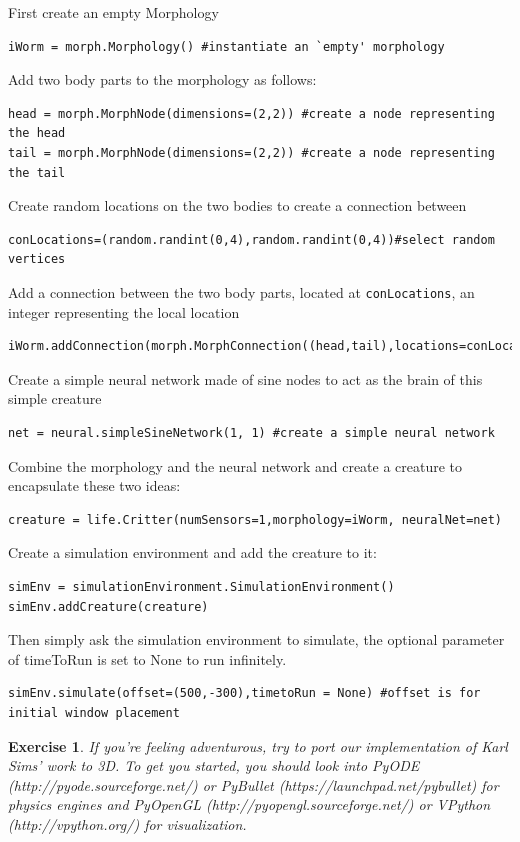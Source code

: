 \documentclass[12pt]{article}
\newtheorem{ex}{Exercise}
\begin{document}
First create an empty Morphology
\begin{verbatim}
iWorm = morph.Morphology() #instantiate an `empty' morphology
\end{verbatim}

Add two body parts to the morphology  as follows:
\begin{verbatim}
head = morph.MorphNode(dimensions=(2,2)) #create a node representing the head
tail = morph.MorphNode(dimensions=(2,2)) #create a node representing the tail
\end{verbatim}

Create random locations on the two bodies to create a connection between
\begin{verbatim}
conLocations=(random.randint(0,4),random.randint(0,4))#select random vertices
\end{verbatim}
Add a connection between the two body parts, located at \verb|conLocations|, an integer representing the local location
\begin{verbatim} 
iWorm.addConnection(morph.MorphConnection((head,tail),locations=conLocations))
\end{verbatim}
Create a simple neural network made of sine nodes to act as the brain of this simple creature
\begin{verbatim}
net = neural.simpleSineNetwork(1, 1) #create a simple neural network
\end{verbatim}
Combine the morphology and the neural network and create a creature to encapsulate these two ideas:
\begin{verbatim}
creature = life.Critter(numSensors=1,morphology=iWorm, neuralNet=net)
\end{verbatim}
Create a simulation environment and add the creature to it:
\begin{verbatim}
simEnv = simulationEnvironment.SimulationEnvironment()
simEnv.addCreature(creature)
\end{verbatim}
Then simply ask the simulation environment to simulate, the optional parameter of timeToRun is set to None to run infinitely.
\begin{verbatim}
simEnv.simulate(offset=(500,-300),timetoRun = None) #offset is for initial window placement
\end{verbatim}

\begin{ex}
If you're feeling adventurous, try to port our implementation of Karl Sims' work to 3D. To get you started, you should look into PyODE (http://pyode.sourceforge.net/) or PyBullet (https://launchpad.net/pybullet) for physics engines and PyOpenGL (http://pyopengl.sourceforge.net/) or VPython (http://vpython.org/) for visualization.
\end{ex}
\end{document}
